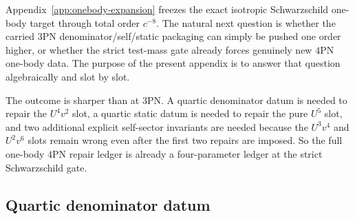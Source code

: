 \documentclass[11pt]{article}
\begin{document}
Appendix~\ref{app:onebody-expansion} freezes the exact isotropic
Schwarzschild one-body target through total order $c^{-8}$.  The natural next
question is whether the carried $3$PN denominator/self/static packaging can
simply be pushed one order higher, or whether the strict test-mass gate already
forces genuinely new $4$PN one-body data.  The purpose of the present appendix
is to answer that question algebraically and slot by slot.

The outcome is sharper than at $3$PN.  A quartic denominator datum is needed to
repair the $U^4v^2$ slot, a quartic static datum is needed to repair the pure
$U^5$ slot, and two additional explicit self-sector invariants are needed
because the $U^3v^4$ and $U^2v^6$ slots remain wrong even after the first two
repairs are imposed.  So the full one-body $4$PN repair ledger is already a
four-parameter ledger at the strict Schwarzschild gate.

\subsection{Quartic denominator datum}
\label{app:onebody-repair-denominator}
\end{document}
